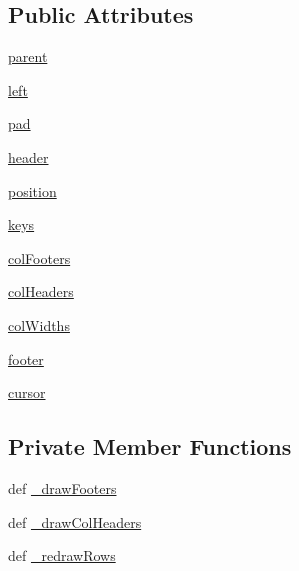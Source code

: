 \subsection*{Public Attributes}
\begin{DoxyCompactItemize}
\item 
\hyperlink{classcurseshelpers_1_1SelectTable_a8b9ac49716dde720352ae0c90742dd61}{parent}
\item 
\hyperlink{classcurseshelpers_1_1SelectTable_a3a7504a36bba5c51821631eb8b2f9bb0}{left}
\item 
\hyperlink{classcurseshelpers_1_1SelectTable_a5367ecb7d4b9fec66f780256d3782518}{pad}
\item 
\hyperlink{classcurseshelpers_1_1SelectTable_a15d194df10420465c15c3ff4b9d30b78}{header}
\item 
\hyperlink{classcurseshelpers_1_1SelectTable_aa1cb943b3c1d9073c244e1e279a6bffa}{position}
\item 
\hyperlink{classcurseshelpers_1_1SelectTable_ac2d5523fa574e7a8e30f23bdd9e240ce}{keys}
\item 
\hyperlink{classcurseshelpers_1_1SelectTable_a2920b0cf2b87179a9f7415e96275dba0}{col\-Footers}
\item 
\hyperlink{classcurseshelpers_1_1SelectTable_a0a89017f05b105c2a99aa82915be772b}{col\-Headers}
\item 
\hyperlink{classcurseshelpers_1_1SelectTable_ad0ed6bd276eaa2a082287b5aa4bc6e5a}{col\-Widths}
\item 
\hyperlink{classcurseshelpers_1_1SelectTable_aef7e9584a763a213f50d1a86785ec8f4}{footer}
\item 
\hyperlink{classcurseshelpers_1_1SelectTable_ac0fd218192eca9c6f808419bfbb7f27b}{cursor}
\end{DoxyCompactItemize}
\subsection*{Private Member Functions}
\begin{DoxyCompactItemize}
\item 
def \hyperlink{classcurseshelpers_1_1SelectTable_a05802212c4dcd8f3ba13bff5dea6a91c}{\-\_\-draw\-Footers}
\item 
def \hyperlink{classcurseshelpers_1_1SelectTable_a5c1479367ef45ef35c07e85d51b9cb0a}{\-\_\-draw\-Col\-Headers}
\item 
def \hyperlink{classcurseshelpers_1_1SelectTable_af62c8e7c2a5d426f9a4dc75339e64355}{\-\_\-redraw\-Rows}
\end{DoxyCompactItemize}
